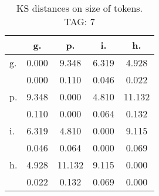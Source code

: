 \begin{table}[h!]
\begin{center}
\begin{tabular}{| l | c | c | c | c |}\hline
 & g. & p. & i. & h. \\\hline
g. & 0.000  & 9.348  & 6.319  & 4.928 \\\hline
 & 0.000  & 0.110  & 0.046  & 0.022 \\\hline
p. & 9.348  & 0.000  & 4.810  & 11.132 \\\hline
 & 0.110  & 0.000  & 0.064  & 0.132 \\\hline
i. & 6.319  & 4.810  & 0.000  & 9.115 \\\hline
 & 0.046  & 0.064  & 0.000  & 0.069 \\\hline
h. & 4.928  & 11.132  & 9.115  & 0.000 \\\hline
 & 0.022  & 0.132  & 0.069  & 0.000 \\\hline
\end{tabular}
\caption{KS distances on size of tokens. TAG: 7}
\end{center}
\end{table}